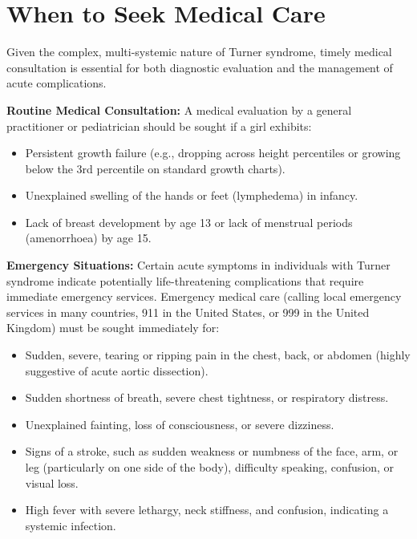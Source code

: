 \section*{When to Seek Medical Care}
Given the complex, multi-systemic nature of Turner syndrome, timely medical consultation is essential for both diagnostic evaluation and the management of acute complications.

\textbf{Routine Medical Consultation:}
A medical evaluation by a general practitioner or pediatrician should be sought if a girl exhibits:
\begin{itemize}
    \item Persistent growth failure (e.g., dropping across height percentiles or growing below the 3rd percentile on standard growth charts).
    \item Unexplained swelling of the hands or feet (lymphedema) in infancy.
    \item Lack of breast development by age 13 or lack of menstrual periods (amenorrhoea) by age 15.
\end{itemize}

\textbf{Emergency Situations:}
Certain acute symptoms in individuals with Turner syndrome indicate potentially life-threatening complications that require immediate emergency services. Emergency medical care (calling local emergency services in many countries, 911 in the United States, or 999 in the United Kingdom) must be sought immediately for:
\begin{itemize}
    \item Sudden, severe, tearing or ripping pain in the chest, back, or abdomen (highly suggestive of acute aortic dissection).
    \item Sudden shortness of breath, severe chest tightness, or respiratory distress.
    \item Unexplained fainting, loss of consciousness, or severe dizziness.
    \item Signs of a stroke, such as sudden weakness or numbness of the face, arm, or leg (particularly on one side of the body), difficulty speaking, confusion, or visual loss.
    \item High fever with severe lethargy, neck stiffness, and confusion, indicating a systemic infection.
\end{itemize}


